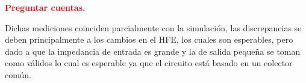 \documentclass[a4paper]{article}
\begin{document}
\begin{center}
	\textcolor{red}{\textbf{Preguntar cuentas.}}
\end{center}


Dichas mediciones coinciden parcialmente con la simulación, las discrepancias se deben principalmente a los cambios en el HFE, los cuales son esperables, pero dado a que la impedancia de entrada es grande y la de salida pequeña se toman como válidos lo cual es esperable ya que el circuito está basado en un colector común.
\end{document}
